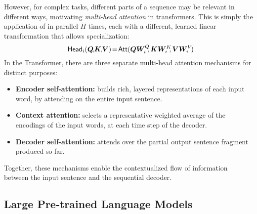 However, for complex tasks, different parts of a sequence may be relevant in
different ways, motivating \emph{multi-head attention} in transformers.
This is simply the application of
 in parallel $H$ times, each with a different,
learned linear transformation that allows specialization:
%
\begin{equation}\label{eq:head}%
    \hspace{-.01ex}%
    \ath_i(\bm{Q}\!,\!\bm{K}\!,\!\bm{V})\!=\!\att(\bm{QW}_i^Q\!\!,\bm{KW}_i^K\!\!,\bm{VW}_i^V\!)%
    \hspace{-1.5ex}%
\end{equation}
%
In the Transformer, there are three separate multi-head attention mechanisms for
distinct purposes:
\begin{itemize}
    \item \textbf{Encoder self-attention:} builds rich, layered representations of
          each input word, by attending on the entire input sentence.
    \item \textbf{Context attention:} selects
          a representative weighted average of the encodings of the input words, at each
          time step of the decoder.
    \item \textbf{Decoder self-attention:} attends over the partial output sentence
          fragment produced so far.
\end{itemize}
Together, these mechanisms enable the contextualized flow of information between
the input sentence and the sequential decoder.

\subsection{Large Pre-trained Language Models}
